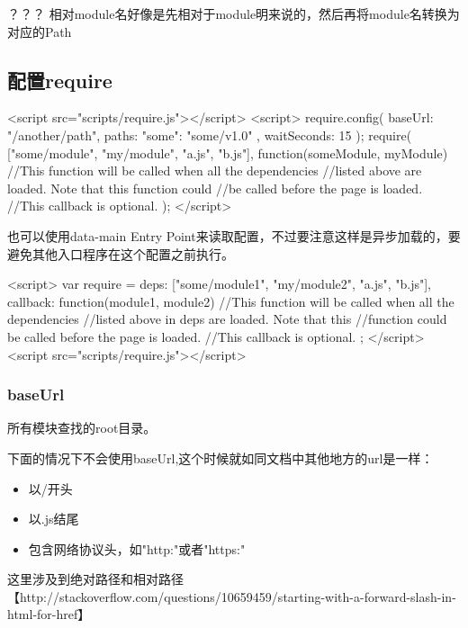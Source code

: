 ？？？ 相对module名好像是先相对于module明来说的，然后再将module名转换为对应的Path


\subsection{配置require}

\begin{JavaScript}
<script src="scripts/require.js"></script>
<script>
  require.config({
    baseUrl: "/another/path",
    paths: {
        "some": "some/v1.0"
    },
    waitSeconds: 15
  });
  require( ["some/module", "my/module", "a.js", "b.js"],
    function(someModule,    myModule) {
        //This function will be called when all the dependencies
        //listed above are loaded. Note that this function could
        //be called before the page is loaded.
        //This callback is optional.
    }
  );
</script>
\end{JavaScript}

也可以使用data-main Entry Point来读取配置，不过要注意这样是异步加载的，要避免其他入口程序在这个配置之前执行。

\begin{JavaScript}[也可以在加载requireJS之前先定义一个require对象]
<script>
    var require = {
        deps: ["some/module1", "my/module2", "a.js", "b.js"],
        callback: function(module1, module2) {
            //This function will be called when all the dependencies
            //listed above in deps are loaded. Note that this
            //function could be called before the page is loaded.
            //This callback is optional.
        }
    };
</script>
<script src="scripts/require.js"></script>
\end{JavaScript}

\subsubsection{baseUrl} 所有模块查找的root目录。

下面的情况下不会使用baseUrl,这个时候就如同文档中其他地方的url是一样：
\begin{itemize}
\item 以/开头
\item 以.js结尾
\item 包含网络协议头，如"http:"或者"https:"
\end{itemize}

这里涉及到绝对路径和相对路径【http://stackoverflow.com/questions/10659459/starting-with-a-forward-slash-in-html-for-href】

